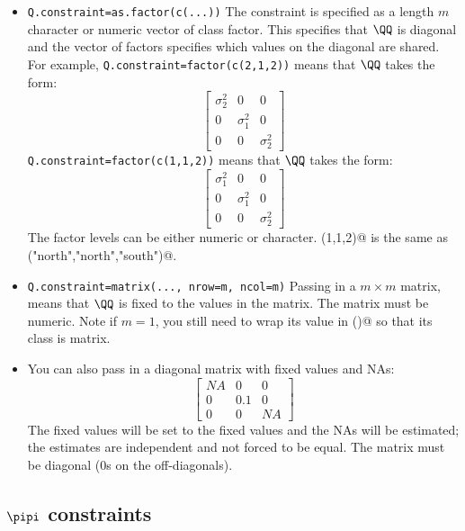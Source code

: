 \begin{itemize}
\item[] \texttt{Q.constraint=as.factor(c(...))} The constraint is specified as a length $m$ character or numeric vector of class factor.  This specifies that $\QQ$ is diagonal and the vector of factors specifies which values on the diagonal are shared.  For example, \texttt{Q.constraint=factor(c(2,1,2))} means that $\QQ$ takes the form:
\begin{equation*}
 \left[ \begin{array}{ccc}
    \sigma^2_2 & 0 & 0\\
    0 & \sigma^2_1 & 0 \\
    0 & 0 & \sigma^2_2 \end{array} \right]
\end{equation*}
 \texttt{Q.constraint=factor(c(1,1,2))} means that $\QQ$ takes the form:
\begin{equation*}
 \left[ \begin{array}{ccc}
    \sigma^2_1 & 0 & 0\\
    0 & \sigma^2_1 & 0 \\
    0 & 0 & \sigma^2_2 \end{array} \right]
\end{equation*}
The factor levels can be either numeric or character.  \verb@c(1,1,2)@ is the same as \verb@c("north","north","south")@.  

\item[] \texttt{Q.constraint=matrix(..., nrow=m, ncol=m)}  Passing in a $m \times m$ matrix, means that $\QQ$ is fixed to the values in the matrix. The matrix must be numeric.  Note if $m=1$, you still need to wrap its value in \verb@matrix()@ so that its class is matrix.  

\item[] You can also pass in a diagonal matrix with fixed values and NAs: 
\begin{equation*}
 \left[ \begin{array}{ccc}
    NA & 0 & 0\\
    0 & 0.1 & 0 \\
    0 & 0 & NA \end{array} \right]
\end{equation*}
The fixed values will be set to the fixed values and the NAs will be estimated; the estimates are independent and not forced to be equal. The matrix must be diagonal (0s on the off-diagonals).

\end{itemize}

\subsection{$\pipi$ constraints}

